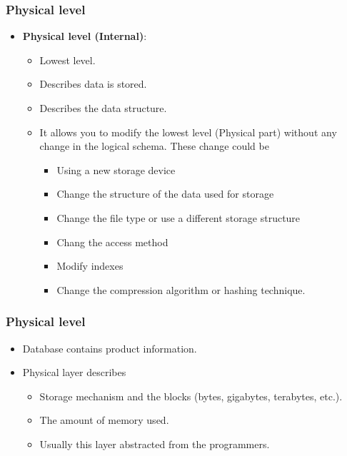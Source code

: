 \begin{frame}
	\frametitle{Physical level}
	\begin{itemize}[<+->]
		\item \textbf{Physical level (Internal)}: 
		\begin{itemize}[<+->]
			\item Lowest level.
			\item Describes \textbf{\underline{}} data is stored.
			\item Describes the data structure.
			\item It allows you to modify the lowest level (Physical part) without any change in the logical schema. These change could be
				\begin{itemize}[<+->]				
					\item Using a new storage device
					\item Change the structure of the data used for storage
					\item Change the file type or use a different storage structure
					\item Chang the access method
					\item Modify indexes
					\item Change the compression algorithm or hashing technique.
			\end{itemize}									
		\end{itemize}		
	\end{itemize}	
\end{frame}
\begin{frame}
	\frametitle{Physical level}
	\begin{example}		
		\begin{itemize}[<+->]
			\item Database contains product information.
			\item Physical layer describes
			\begin{itemize}[<+->]
				\item Storage mechanism and the blocks (bytes, gigabytes, terabytes, etc.).
				\item The amount of memory used.
				\item Usually this layer abstracted from the programmers.
			\end{itemize}
		\end{itemize}
	\end{example}
	
\end{frame}
